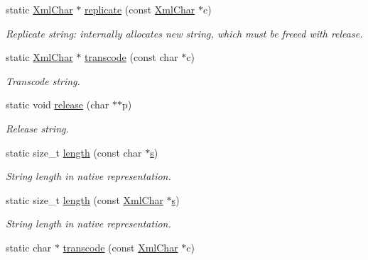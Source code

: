 \begin{DoxyCompactItemize}
\item 
static \hyperlink{namespace_d_d4hep_1_1_x_m_l_a09e5d9cc86ed782f6826dfe0778c1815}{Xml\+Char} $\ast$ \hyperlink{class_d_d4hep_1_1_x_m_l_1_1_xml_string_abdbc8c621c1b0f8659e89794aa9a38b5}{replicate} (const \hyperlink{namespace_d_d4hep_1_1_x_m_l_a09e5d9cc86ed782f6826dfe0778c1815}{Xml\+Char} $\ast$c)
\begin{DoxyCompactList}\small\item\em Replicate string\+: internally allocates new string, which must be free\textquotesingle{}ed with release. \end{DoxyCompactList}\item 
static \hyperlink{namespace_d_d4hep_1_1_x_m_l_a09e5d9cc86ed782f6826dfe0778c1815}{Xml\+Char} $\ast$ \hyperlink{class_d_d4hep_1_1_x_m_l_1_1_xml_string_af1afd620f73d33ad44ca67369e8d0b81}{transcode} (const char $\ast$c)
\begin{DoxyCompactList}\small\item\em Transcode string. \end{DoxyCompactList}\item 
static void \hyperlink{class_d_d4hep_1_1_x_m_l_1_1_xml_string_a42d7ff7f40a01e22f148a444526402ba}{release} (char $\ast$$\ast$p)
\begin{DoxyCompactList}\small\item\em Release string. \end{DoxyCompactList}\item 
static size\+\_\+t \hyperlink{class_d_d4hep_1_1_x_m_l_1_1_xml_string_aa4237a8d0f89aa98c8322ca4893c2b74}{length} (const char $\ast$\hyperlink{_volumes_8cpp_a17ca6bfc8040d695d3cada22a4763d40}{s})
\begin{DoxyCompactList}\small\item\em String length in native representation. \end{DoxyCompactList}\item 
static size\+\_\+t \hyperlink{class_d_d4hep_1_1_x_m_l_1_1_xml_string_a71fddc08af6472ad59d6314ae371bd94}{length} (const \hyperlink{namespace_d_d4hep_1_1_x_m_l_a09e5d9cc86ed782f6826dfe0778c1815}{Xml\+Char} $\ast$\hyperlink{_volumes_8cpp_a17ca6bfc8040d695d3cada22a4763d40}{s})
\begin{DoxyCompactList}\small\item\em String length in native representation. \end{DoxyCompactList}\item 
static char $\ast$ \hyperlink{class_d_d4hep_1_1_x_m_l_1_1_xml_string_a776e51170b0989bbe06f0031c169cb77}{transcode} (const \hyperlink{namespace_d_d4hep_1_1_x_m_l_a09e5d9cc86ed782f6826dfe0778c1815}{Xml\+Char} $\ast$c)
$$
\end{DoxyCompactItemize}

